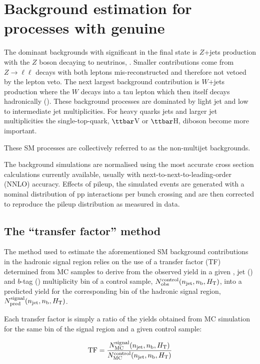 
\section{Background estimation for processes with genuine \met}

The dominant backgrounds with significant \met in the final state
is $Z$+jets production with the $Z$ boson decaying to neutrinos, \znunu. 
Smaller contributions come from $Z\to \ell \ell$ decays with both leptons
mis-reconstructed and therefore not vetoed by the lepton veto. The next largest
background contribution is $W$+jets production where the $W$ decays into a tau lepton which
then itself decays hadronically (\wtaunu). These background processes are dominated
by light jet and low to intermediate jet multiplicities. For heavy quarks jets and larger jet 
multiplicities the single-top-quark, $\ttbar$V or $\ttbar$H, diboson become more important.

These SM processes are collectively referred to as the non-multijet backgrounds.

The background simulations are normalised using the most accurate cross
section calculations currently available, usually with next-to-next-to-leading-order (NNLO) accuracy. 
Effects of pileup, the simulated events are generated with a nominal distribution
of pp interactions per bunch crossing and are then corrected to reproduce the pileup distribution as measured in data. 

\subsection{The ``transfer factor'' method}
\label{sec:ewk-method}

The method used to estimate the aforementioned SM background contributions in the hadronic signal region relies on the use of a
transfer factor (TF) determined from MC samples to derive from the observed yield in a given \scalht, jet (\njet) and $b$-tag (\nb)
multiplicity bin of a control sample, $N_{\textrm{obs}}^{\rm control}(n_{\text{jet}},n_{\text{b}},\mbox{$H_\text{T}$})$, into a predicted yield for the
corresponding bin of the hadronic signal region, $N_{\textrm{pred}}^{\rm  signal}(n_{\text{jet}},n_{\text{b}},\mbox{$H_\text{T}$})$. 

Each transfer factor is simply a ratio of the yields obtained from MC
simulation for the same bin of the signal region and a given control
sample:

\begin{equation}
  \label{equ:tf-ratio}
  {\rm TF} = \frac{N_{\rm MC}^{\rm signal}(n_{\text{jet}},n_{\text{b}},\mbox{$H_\text{T}$})}{N_{\rm
      MC}^{\rm control}(n_{\text{jet}},n_{\text{b}},\mbox{$H_\text{T}$})} 
\end{equation}

